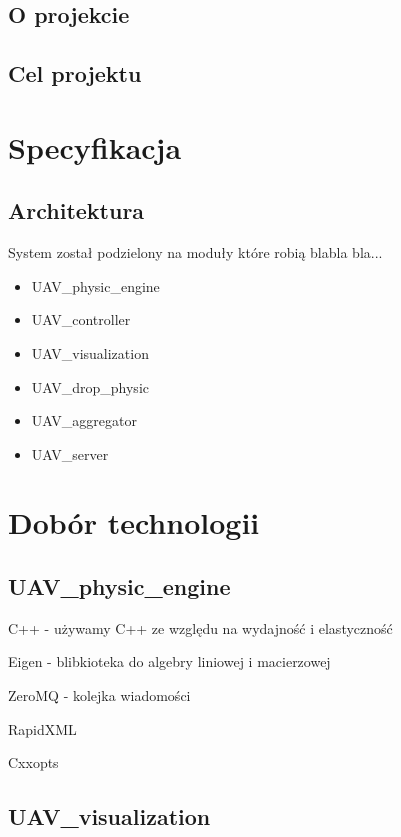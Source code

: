 \documentclass[15pt]{sprawozdanie}
\begin{document}
\subsection{O projekcie}

\subsection{Cel projektu}

\section{Specyfikacja}



\subsection{Architektura}

System został podzielony na moduły które robią blabla bla...

\begin{itemize}
\item UAV\_physic\_engine 
\item UAV\_controller 
\item UAV\_visualization 
\item UAV\_drop\_physic 
\item UAV\_aggregator 
\item UAV\_server 

\end{itemize}

\newpage

\section{Dobór technologii}

\subsection{UAV\_physic\_engine}

C++ - używamy C++ ze względu na wydajność i elastyczność

Eigen - blibkioteka do algebry liniowej i macierzowej

ZeroMQ - kolejka wiadomości

RapidXML

Cxxopts

\subsection{UAV\_visualization}
\end{document}
